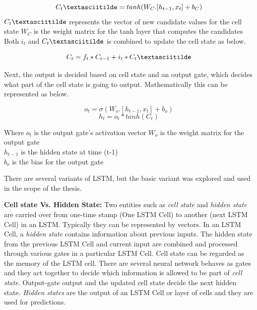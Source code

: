 \begin{equation}
C_t\textasciitilde = tanh(W_C. [h_{t-1}, x_t ] + b_C)
\end{equation}
$C_t\textasciitilde$ represents the vector of new candidate values for the cell state
$W_C$ is the weight matrix for the tanh layer that computes the candidates\\
Both $i_t$ and $C_t\textasciitilde$ is combined to update the cell state as below.

\begin{equation}
C_t = f_t * C_{t-1} + i_t * C_t\textasciitilde
\end{equation}

Next, the output is decided based on cell state and an output gate, which decides what part of the cell state is going to output. Mathematically this can be represented as below.

\begin{equation}
o_t = \sigma(W_o. [h_{t-1}, x_t  ] + b_o)
\end{equation}
\begin{equation}
h_t = o_t  * tanh(C_t)
\end{equation}

\pagebreak

Where $o_t$ is the output gate's activation vector 
$W_o$ is the weight matrix for the output gate \\
$h_{t-1}$ is the hidden state at time (t-1) \\
$b_o$ is the bias for the output gate

There are several variants of LSTM, but the basic variant was explored and used in the scope of the thesis.

\textbf{Cell state Vs. Hidden State:}
Two entities such as \textit{cell state} and \textit{hidden state} are carried over from one-time stamp (One LSTM Cell) to another (next LSTM Cell) in an LSTM. Typically they can be represented by vectors. In an LSTM Cell, a \textit{hidden state }contains information about previous inputs. The hidden state from the previous LSTM Cell and current input are combined and processed through various gates in a particular LSTM Cell. Cell state can be regarded as the memory of the LSTM cell. There are several neural network behaves as gates and they act together to decide which information is allowed to be part of \textit{cell state}. Output-gate output and the updated cell state decide the next hidden state. \textit{Hidden states} are the output of an LSTM Cell or layer of cells and they are used for predictions.  

